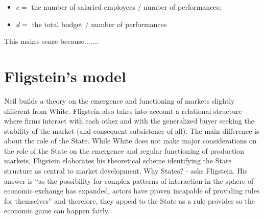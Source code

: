 \documentclass[a4paper, 12pt, openright, oneside, german, french, brazil, english]{abntex2}
\begin{document}
        \begin{itemize}
        \item $c =$ the number of salaried employees $/$ number of performances;
        \item $d =$ the total budget $/$ number of performances
        \end{itemize}

        This makes sense because....... %
	
	
	\section{Fligstein's model}
	
	
	
	Neil  builds a theory on the emergence and functioning of markets slightly different from White. Fligstein also takes into account a relational structure where firms interact with each other and with the generalized buyer seeking the stability of the market (and consequent subsistence of all). The main difference is about the role of the State. While White does not make major considerations on the role of the State on the emergence and regular functioning of production markets, Fligstein elaborates his theoretical scheme identifying the State structure as central to market development. Why States? - asks Fligstein. His answer is ``as the possibility for complex patterns of interaction in the sphere of economic exchange has expanded, actors have proven incapable of providing rules for themselves'' \cite[p. 27-8]{fligstein2002architecture} and therefore, they appeal to the State as a rule provider so the economic game can happen fairly.
\end{document}
